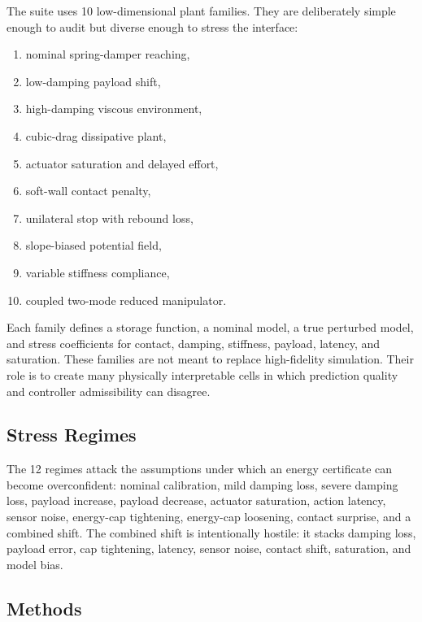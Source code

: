 \documentclass{article}
\begin{document}
The suite uses 10 low-dimensional plant families. They are deliberately simple enough to audit but diverse enough to stress the interface:
\begin{enumerate}
    \item nominal spring-damper reaching,
    \item low-damping payload shift,
    \item high-damping viscous environment,
    \item cubic-drag dissipative plant,
    \item actuator saturation and delayed effort,
    \item soft-wall contact penalty,
    \item unilateral stop with rebound loss,
    \item slope-biased potential field,
    \item variable stiffness compliance,
    \item coupled two-mode reduced manipulator.
\end{enumerate}
Each family defines a storage function, a nominal model, a true perturbed model, and stress coefficients for contact, damping, stiffness, payload, latency, and saturation. These families are not meant to replace high-fidelity simulation. Their role is to create many physically interpretable cells in which prediction quality and controller admissibility can disagree.

\subsection{Stress Regimes}

The 12 regimes attack the assumptions under which an energy certificate can become overconfident: nominal calibration, mild damping loss, severe damping loss, payload increase, payload decrease, actuator saturation, action latency, sensor noise, energy-cap tightening, energy-cap loosening, contact surprise, and a combined shift. The combined shift is intentionally hostile: it stacks damping loss, payload error, cap tightening, latency, sensor noise, contact shift, saturation, and model bias.

\subsection{Methods}
\end{document}
